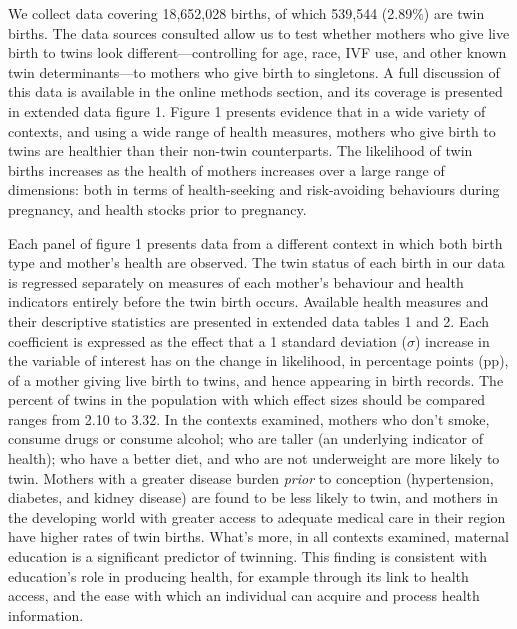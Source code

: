 \documentclass{nature}
\begin{document}
\begin{linenumbers}
We collect data covering 18,652,028 births, of which 539,544 (2.89\%) are twin births. The data sources consulted allow us to test whether mothers who give live birth to twins look different---controlling for age, race, IVF use, and other known twin determinants\cite{Hoekstraetal2008}---to mothers who give birth to singletons. A full discussion of this data is available in the online methods section, and its coverage is presented in extended data figure 1.   Figure 1 presents evidence that in a wide variety of contexts, and using a wide range of health measures, mothers who give birth to twins are healthier than their non-twin counterparts. The likelihood of twin births increases as the health of mothers increases over a large range of dimensions: both in terms of health-seeking and risk-avoiding behaviours during pregnancy, and health stocks prior to pregnancy.

Each panel of figure 1 presents data from a different context in which both birth type and mother's health are observed. The twin status of each birth in our data is regressed separately on measures of each mother's behaviour and health indicators entirely before the twin birth occurs. Available health measures and their descriptive statistics are presented in extended data tables 1 and 2. Each coefficient is expressed as the effect that a 1 standard deviation ($\sigma$) increase in the variable of interest has on the change in likelihood, in percentage points (pp), of a mother giving live birth to twins, and hence appearing in birth records.  The percent of twins in the population with which effect sizes should be compared ranges from 2.10 to 3.32.  In the contexts examined, mothers who don't smoke, consume drugs or consume alcohol; who are taller (an underlying indicator of health\cite{Silventoinen2003,BhalotraRawlings2013}); who have a better diet, and who are not underweight are more likely to twin.  Mothers with a greater disease burden \emph{prior} to conception (hypertension, diabetes, and kidney disease) are found to be less likely to twin, and mothers in the developing world with greater access to adequate medical care in their region have higher rates of twin births.  What's more, in all contexts examined, maternal education is a significant predictor of twinning.  This finding is consistent with education's role in producing health, for example through its link to health access, and the ease with which an individual can acquire and process health information\cite{Kenkel1991,CutlerLlerasMuney2010}.


\end{linenumbers}
\end{document}
